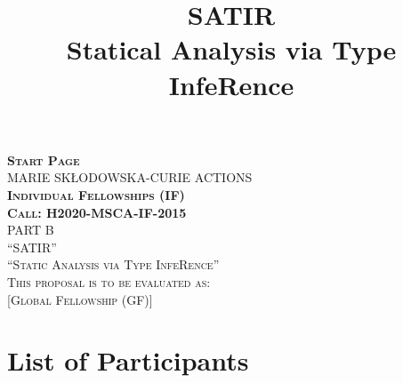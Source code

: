\documentclass{article}[11pt]
\title{SATIR\\ Statical Analysis via Type InfeRence}
\begin{document}
\begin{titlepage} 
  \vspace*{1.5cm}%
  \begin{center}
    \textsc{\huge\bf Start Page}\\[1.5cm]
    \textsc{\huge MARIE SKŁODOWSKA-CURIE ACTIONS}\\[1.5cm]
    \textsc{\bf\LARGE Individual Fellowships (IF)}\\
    \textsc{\bf\LARGE Call: H2020-MSCA-IF-2015}\\[1.5cm]
    \textsc{\LARGE PART B}\\[4cm] 
    \textsc{\Huge ``SATIR''}\\[0.5cm]
    \textsc{\LARGE ``Static Analysis via Type InfeRence''}\\[9cm]
    \textsc{\LARGE This proposal is to be evaluated as:}\\[0.5cm]
    \textsc{\LARGE [Global Fellowship (GF)]}
  \end{center} 
\end{titlepage}

\tableofcontents


\section*{List of Participants}
\end{document}
